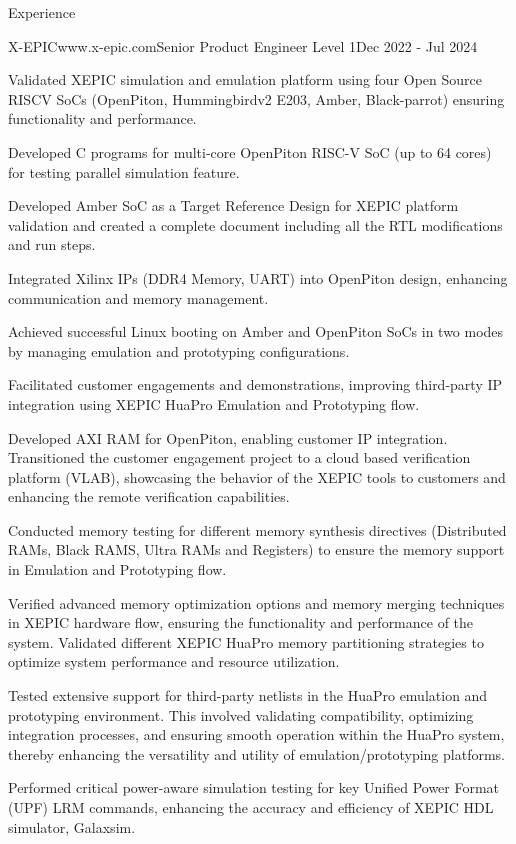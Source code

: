 \documentclass[
11pt, %
]{./assets/resume} %
\begin{document}
\begin{rSection}{Experience}
	\begin{rSubsectionX}{X-EPIC}{www.x-epic.com}{Senior Product Engineer Level 1}{Dec 2022 - Jul 2024}
		\item Validated XEPIC simulation and emulation platform using four Open Source RISCV SoCs (OpenPiton, Hummingbirdv2 E203, Amber, Black-parrot) ensuring functionality and performance. 
		\item Developed C programs for multi-core OpenPiton RISC-V SoC (up to 64 cores) for testing parallel simulation feature.
		\item Developed Amber SoC as a Target Reference Design for XEPIC platform validation and created a complete document including all the RTL modifications and run steps. 
		\item Integrated Xilinx IPs (DDR4 Memory, UART) into OpenPiton design, enhancing communication and memory management. 
		\item Achieved successful Linux booting on Amber and OpenPiton SoCs in two modes by managing emulation and prototyping configurations. 
		\item Facilitated customer engagements and demonstrations, improving third-party IP integration using XEPIC HuaPro Emulation and Prototyping flow. 
		\item Developed AXI RAM for OpenPiton, enabling customer IP integration. Transitioned the customer engagement project to a cloud based verification platform (VLAB), showcasing the behavior of the XEPIC tools to customers and enhancing the remote verification capabilities. 
		\item Conducted memory testing for different memory synthesis directives (Distributed RAMs, Black RAMS, Ultra RAMs and Registers) to ensure the memory support in Emulation and Prototyping flow. 
		\item Verified advanced memory optimization options and memory merging techniques in XEPIC hardware flow, ensuring the functionality and performance of the system. Validated different XEPIC HuaPro memory partitioning strategies to optimize system performance and resource utilization. 
		\item Tested extensive support for third-party netlists in the HuaPro emulation and prototyping environment. This involved validating compatibility, optimizing integration processes, and ensuring smooth operation within the HuaPro system, thereby enhancing the versatility and utility of emulation/prototyping platforms.
		\item Performed critical power-aware simulation testing for key Unified Power Format (UPF) LRM commands, enhancing the accuracy and efficiency of XEPIC HDL simulator, Galaxsim. 

\end{rSubsectionX}
\end{rSection}
\end{document}
